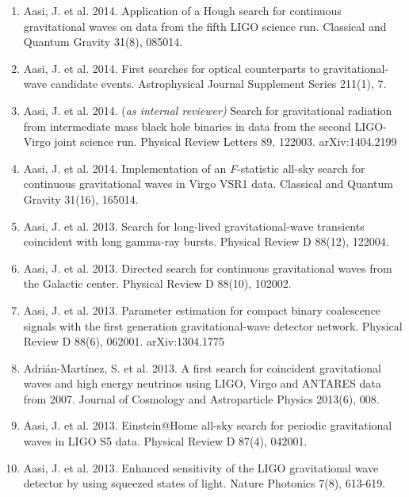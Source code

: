 \documentclass[margin,line]{res}
\begin{document}
\begin{resume}
\begin{enumerate}
\item Aasi, J. et al. 2014. Application of a Hough search for continuous gravitational waves on data from the fifth LIGO science run. Classical and Quantum Gravity 31(8), 085014. 

\item Aasi, J. et al. 2014. First searches for optical counterparts to gravitational-wave candidate events. Astrophysical Journal Supplement Series 211(1), 7. 

\item  Aasi, J. et al.  2014.  {(\it as internal reviewer)}  Search for gravitational radiation from intermediate mass black hole binaries in data from the second LIGO-Virgo joint science run.  Physical Review Letters 89, 122003.  arXiv:1404.2199

\item Aasi, J. et al. 2014. Implementation of an {\it F}-statistic all-sky search for continuous gravitational waves in Virgo VSR1 data. Classical and Quantum Gravity 31(16), 165014.

\item Aasi, J. et al. 2013. Search for long-lived gravitational-wave transients coincident with long gamma-ray bursts. Physical Review D 88(12), 122004. 

\item Aasi, J. et al. 2013. Directed search for continuous gravitational waves from the Galactic center. Physical Review D 88(10), 102002. 

\item Aasi, J. et al. 2013. Parameter estimation for compact binary coalescence signals with the first generation gravitational-wave detector network. Physical Review D 88(6), 062001.  arXiv:1304.1775

\item Adri\'{a}n-Mart\'{i}nez, S. et al. 2013. A first search for coincident gravitational waves and high energy neutrinos using LIGO, Virgo and ANTARES data from 2007. Journal of Cosmology and Astroparticle Physics 2013(6), 008. 

\item Aasi, J. et al. 2013. Einstein@Home all-sky search for periodic gravitational waves in LIGO S5 data. Physical Review D  87(4), 042001. 

\item Aasi, J. et al. 2013. Enhanced sensitivity of the LIGO gravitational wave detector by using squeezed states of light. Nature Photonics 7(8),  613-619.


\end{enumerate}
\end{resume}
\end{document}
